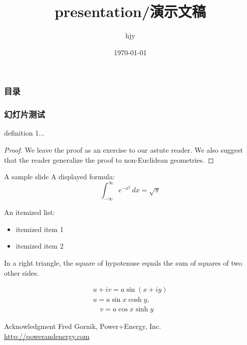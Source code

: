 \documentclass[12pt,a4paper,CJK]{beamer}
\author{hjy}
\title{presentation/演示文稿}
\institute{TongJi University}
\date{\today}
\begin{document}
\begin{CJK*}{UTF8}{gkai}
\begin{frame} 				
	\titlepage 
\end{frame}
	
\begin{frame}
	\frametitle{目录}
	\tableofcontents
\end{frame}
  
\begin{frame}
	\frametitle{幻灯片测试}
	\setlength{\fboxrule}{4pt} 
	
	\pause
	\begin{definition}
		definition 1...
	\end{definition}
	
	\begin{proof}
  		We leave the proof as an exercise to our astute reader.
  		We also suggest that the reader generalize the proof to
  		non-Euclidean geometries.
	\end{proof}
\end{frame}
    
\begin{frame}[label=sample]{A sample slide}
	A displayed formula:
	\[
		\int_{-\infty}^\infty e^{-x^2} \, dx = \sqrt{\pi}
	\]

	An itemized list:
	\begin{itemize}
  		\item itemized item 1
  		\item itemized item 2
	\end{itemize}

	\begin{theorem}
		In a right triangle, the square of hypotenuse equals
		the sum of squares of two other sides.
	\end{theorem}
	
	\begin{gather}
 		 u + iv = a \sin(x + iy) \\
  		u = a \sin x \cosh y, \\
  	 	\quad v = a \cos x \sinh y
	\end{gather}
\end{frame}

\begin{frame}{Acknowledgment}
Fred Gornik, Power+Energy, Inc.\\
\href{http://powerandenergy.com}{http://powerandenergy.com}


\end{frame}
\end{CJK*}
\end{document}
